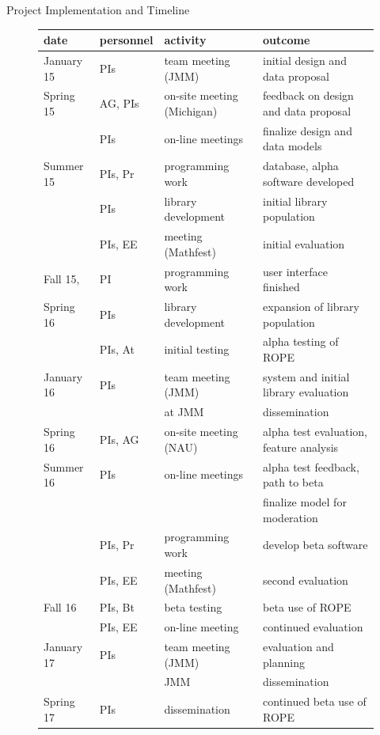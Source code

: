 \documentclass[11pt]{article}
\begin{document}
\begin{section}{Project Implementation and Timeline}
\begin{figure}
\begin{center}
\begin{tabular}{|l|l|l|l|}
  \hline
  \textbf{date} & \textbf{personnel} & \textbf{activity} & \textbf{outcome}\\
  \hline
  \hline
  January 15 & PIs & team meeting (JMM) & initial design and data proposal\\
  \hline
  Spring 15 & AG, PIs & on-site meeting (Michigan)
	& feedback on design and data proposal\\
	& PIs & on-line meetings & finalize design and data models\\
  \hline
  Summer 15 & PIs, Pr & programming work & database, alpha
	software developed \\ 
	& PIs & library development & initial library population \\
	& PIs, EE & meeting (Mathfest) & initial evaluation \\
  \hline
  Fall 15, & PI & programming work & user interface finished \\ 
  Spring 16 & PIs & library development & expansion of library population \\
	& PIs, At & initial testing & alpha testing of ROPE \\
  \hline 
  January 16 & PIs & team meeting (JMM) & system and initial library evaluation \\
        &  & at JMM & dissemination \\
  \hline
  Spring 16 & PIs, AG & on-site meeting (NAU) & alpha test evaluation,
        feature analysis \\
  \hline
  Summer 16 & PIs & on-line meetings &
 	alpha test feedback, path to beta \\
	& & & finalize model for moderation \\
	& PIs, Pr & programming work & develop beta software \\
        & PIs, EE & meeting (Mathfest) & second evaluation \\
  \hline
  Fall 16 & PIs, Bt & beta testing & beta use of ROPE \\
	& PIs, EE & on-line meeting & continued evaluation \\
  \hline
  January 17 & PIs & team meeting (JMM) & evaluation and planning \\
        & & JMM & dissemination \\
  \hline
  Spring 17 & PIs & dissemination & continued beta use of ROPE \\

\end{tabular}
\end{center}
\end{figure}
\end{section}
\end{document}
